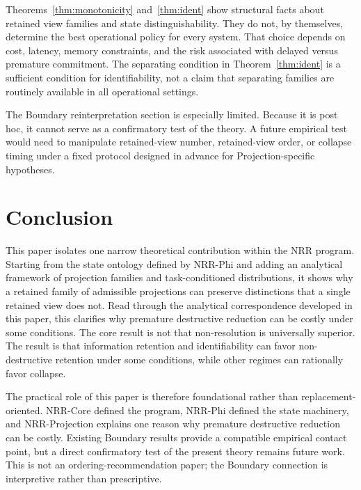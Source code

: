 \documentclass[11pt,a4paper]{article}
\begin{document}
Theorems~\ref{thm:monotonicity} and~\ref{thm:ident} show structural facts about retained view families and state distinguishability. They do not, by themselves, determine the best operational policy for every system. That choice depends on cost, latency, memory constraints, and the risk associated with delayed versus premature commitment.
The separating condition in Theorem~\ref{thm:ident} is a sufficient condition for identifiability, not a claim that separating families are routinely available in all operational settings.

The Boundary reinterpretation section is especially limited. Because it is post hoc, it cannot serve as a confirmatory test of the theory. A future empirical test would need to manipulate retained-view number, retained-view order, or collapse timing under a fixed protocol designed in advance for Projection-specific hypotheses.

\section{Conclusion}
\label{sec:conclusion}

This paper isolates one narrow theoretical contribution within the NRR program. Starting from the state ontology defined by NRR-Phi \cite{saito2026phi} and adding an analytical framework of projection families and task-conditioned distributions, it shows why a retained family of admissible projections can preserve distinctions that a single retained view does not. Read through the analytical correspondence developed in this paper, this clarifies why premature destructive reduction can be costly under some conditions. The core result is not that non-resolution is universally superior. The result is that information retention and identifiability can favor non-destructive retention under some conditions, while other regimes can rationally favor collapse.

The practical role of this paper is therefore foundational rather than replacement-oriented. NRR-Core \cite{saito2025nrr} defined the program, NRR-Phi \cite{saito2026phi} defined the state machinery, and NRR-Projection explains one reason why premature destructive reduction can be costly. Existing Boundary results \cite{saito2026boundary} provide a compatible empirical contact point, but a direct confirmatory test of the present theory remains future work. This is not an ordering-recommendation paper; the Boundary connection is interpretive rather than prescriptive.
\end{document}
